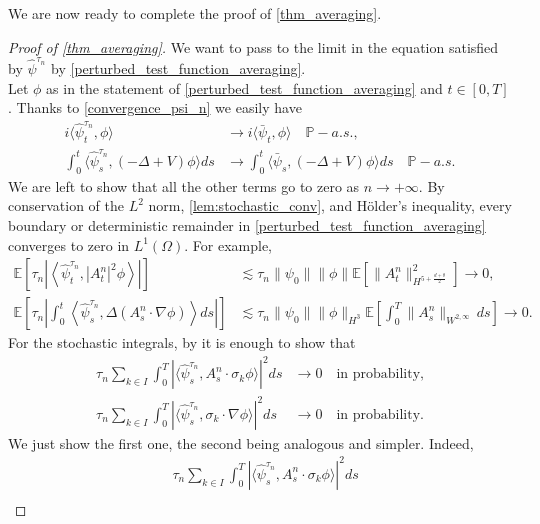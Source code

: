 \documentclass[a4paper,10pt]{amsart}
\theoremstyle{remark}
\numberwithin{equation}{section}
\begin{document}
We are now ready to complete the proof of \cref{thm_averaging}.
\begin{proof}[Proof of \cref{thm_averaging}]
We want to pass to the limit in the equation satisfied by $\hat{\psi}^{\tau_n}$  by \cref{perturbed_test_function_averaging}.\\
Let $\phi $ as in the statement of \cref{perturbed_test_function_averaging} and $t\in [0,T]$. Thanks to \eqref{convergence_psi_n} we easily have
\begin{align*}
    i\langle \hat{\psi}^{\tau_n}_t, \phi\rangle&\rightarrow i\langle \bar{\psi}_t,\phi\rangle\quad\mathbb{P}-a.s.,\\
    \int_0^t \langle \hat{\psi}^{\tau_n}_s, (-\Delta+V)\phi\rangle ds&\rightarrow \int_0^t \langle \bar{\psi}_s, (-\Delta+V)\phi\rangle ds\quad\mathbb{P}-a.s.
\end{align*}
We are left to show that all the other terms go to zero as
$n\rightarrow+\infty$. By conservation of the $L^2$ norm,
\cref{lem:stochastic_conv}, and H\"older's inequality, every boundary or
deterministic remainder in \cref{perturbed_test_function_averaging} converges
to zero in $L^1(\Omega)$. For example,
\begin{align*}
 \mathbb E\left[
 \tau_n\left|\left\langle\hat\psi_t^{\tau_n},|A_t^n|^2\phi\right\rangle\right|
 \right]
 &\lesssim \tau_n\|\psi_0\|\|\phi\|
 \mathbb E\left[\|A_t^n\|_{H^{5+\frac{d+\theta}{2}}}^2\right]\longrightarrow0,\\
 \mathbb E\left[
 \tau_n\left|\int_0^t
 \left\langle\hat\psi_s^{\tau_n},
 \Delta(A_s^n\cdot\nabla\phi)\right\rangle ds\right|\right]
 &\lesssim \tau_n\|\psi_0\|\|\phi\|_{H^3}
 \mathbb E\left[\int_0^T\|A_s^n\|_{W^{2,\infty}}\,ds\right]\longrightarrow0.
\end{align*}
For the stochastic integrals, by \cite[Lemma 4.3]{bagnara2025no} it is
enough to show that
\begin{align*}
    \tau_n\sum_{k\in I }\int_0^T \left|\langle\hat{\psi}^{\tau_n}_s, A^n_s\cdot \sigma_k\phi\rangle\right|^2 ds&\rightarrow 0\quad\mbox{in probability,} \\
    \tau_n\sum_{k\in I }\int_0^T \left|\langle\hat{\psi}^{\tau_n}_s, \sigma_k\cdot\nabla\phi\rangle\right|^2 ds&\rightarrow 0\quad\mbox{in probability.} 
\end{align*}
We just show the first one, the second being analogous and simpler.
Indeed,
\begin{align*}
 &\tau_n\sum_{k\in I }\int_0^T
 \left|\langle\hat{\psi}^{\tau_n}_s,A^n_s\cdot\sigma_k\phi\rangle\right|^2ds\\

\end{align*}
\end{proof}
\end{document}
